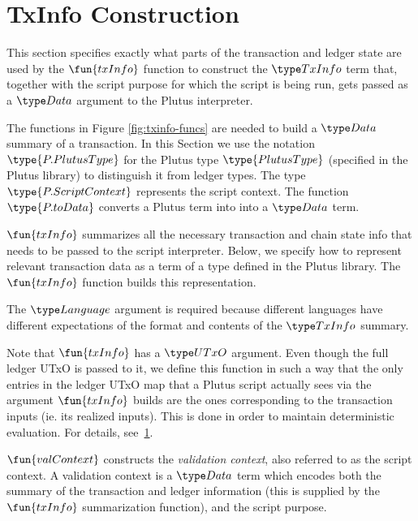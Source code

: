 \section{TxInfo Construction}
\label{sec:txinfo}

This section specifies exactly what parts of the transaction and ledger
state are used by the $\fun{txInfo}$ function to construct the
$\TxInfo$ term that, together with the script purpose for which the script
is being run, gets passed as a $\Data$ argument to the Plutus interpreter.

The functions in Figure \ref{fig:txinfo-funcs} are needed to build a $\Data$ summary of a transaction.
In this Section we use the notation $\type{P.PlutusType}$ for the Plutus type
$\type{PlutusType}$ (specified in the Plutus library) to distinguish it from ledger types.
The type $\type{P.ScriptContext}$ represents
the script context. The function $\type{P.toData}$ converts a Plutus term
into into a $\Data$ term.

$\fun{txInfo}$ summarizes all the necessary transaction and chain state info
    that needs to be passed to the script interpreter. Below, we specify how to
    represent relevant transaction data as a term of a type defined in the Plutus
    library. The $\fun{txInfo}$ function builds this representation.

    The $\Language$ argument
    is required because different languages have different expectations of the
    format and contents of the $\TxInfo$ summary.

    Note that $\fun{txInfo}$ has a $\UTxO$ argument. Even though the full ledger UTxO
    is passed to it, we define this function in such a way that the only
    entries in the ledger UTxO map that a Plutus script
    actually sees via the argument $\fun{txInfo}$ builds are the ones corresponding to the transaction
    inputs (ie. its realized inputs). This is done in order to maintain
    deterministic evaluation. For details, see~\ref{sec:txinfo}.

    $\fun{valContext}$ constructs the \emph{validation context}, also referred to as the
    script context. A validation context is
    a $\Data$ term which encodes both the summary of the transaction and ledger information
    (this is supplied by the $\fun{txInfo}$ summarization function), and the script purpose.

